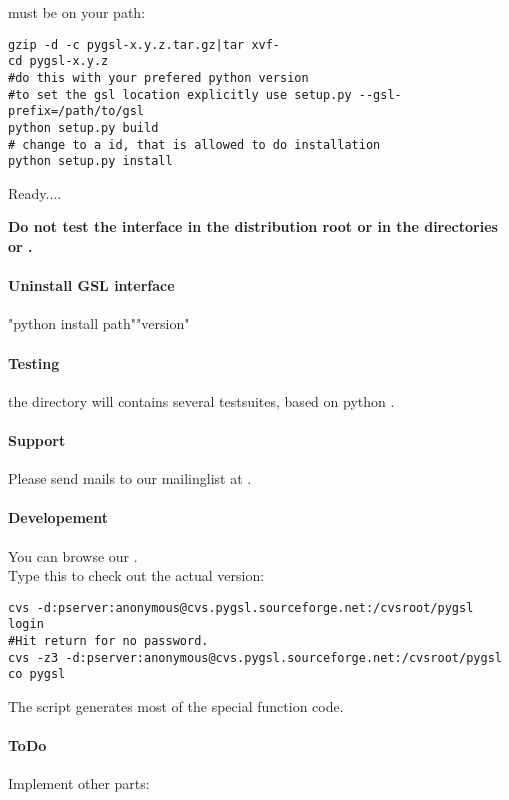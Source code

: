  must be on your path:\nopagebreak
\begin{verbatim}
gzip -d -c pygsl-x.y.z.tar.gz|tar xvf-
cd pygsl-x.y.z
#do this with your prefered python version
#to set the gsl location explicitly use setup.py --gsl-prefix=/path/to/gsl
python setup.py build
# change to a id, that is allowed to do installation
python setup.py install
\end{verbatim}
Ready....

{\bf Do not test the interface in the distribution root or in the directories  or .}

\paragraph*{Uninstall GSL interface}
"python install path""version"

\paragraph*{Testing}
the directory  will contains several testsuites, based on python .

\paragraph*{Support}
Please send mails to our mailinglist at .

\paragraph*{Developement}

You can browse our .
\\
Type this to check out the actual version:
\begin{verbatim}
cvs -d:pserver:anonymous@cvs.pygsl.sourceforge.net:/cvsroot/pygsl login
#Hit return for no password.
cvs -z3 -d:pserver:anonymous@cvs.pygsl.sourceforge.net:/cvsroot/pygsl co pygsl
\end{verbatim}
The script  generates most of the special function code.

\paragraph*{ToDo}
Implement other parts:

